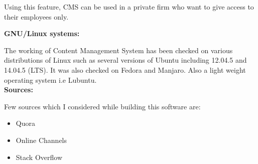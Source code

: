 Using this feature, CMS can be used in a private firm who want to give access to their employees only.

\newpage
 \textbf{GNU/Linux systems:}
 
The working of Content Management System has been checked on various distributions of Linux such as several versions of Ubuntu including 12.04.5 and 14.04.5 (LTS). It was also checked on Fedora and Manjaro. Also a light weight operating system i.e Lubuntu.\\
 
 \textbf{Sources:}
 
Few sources which I considered while building this software are:
\begin{itemize}
\item Quora
\item Online Channels
\item Stack Overflow
\end{itemize}

 

 
  
